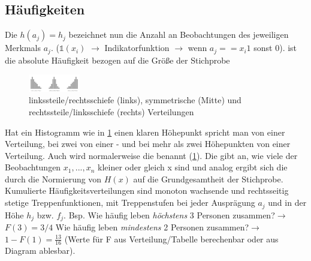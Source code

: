 \subsection{Häufigkeiten}
Die  $h(a_j) = h_j$ bezeichnet nun die Anzahl an Beobachtungen des jeweiligen Merkmals $a_j$.  ($\mathds{1}(x_i)$ $\rightarrow$ Indikatorfunktion $\rightarrow$ wenn $a_j == x_i 1$ sonst $0$).  ist die absolute Häufigkeit bezogen auf die Größe der Stichprobe  
\begin{figure}
    \centering
    \includegraphics[width=0.2\textwidth]{images/2.3_histogramme_schiefheit.png}
    \caption{linkssteile/rechtsschiefe (links), symmetrische (Mitte) und rechtssteile/linksschiefe
    (rechts) Verteilungen}
    \vspace{-12mm}
    \label{fig:schiefheit}
\end{figure}
Hat ein Histogramm wie in \cref{fig:schiefheit} einen klaren Höhepunkt spricht man von einer  Verteilung, bei zwei von einer - und bei mehr als zwei Höhepunkten von einer  Verteilung. Auch wird normalerweise die  benannt (\cref{fig:schiefheit}).
Die  gibt an, wie viele der Beobachtungen $x_1, ..., x_n$ kleiner oder gleich x sind und analog ergibt sich die   durch die Normierung von $H(x)$ auf die Grundgesamtheit der Stichprobe. Kumulierte Häufigkeitsverteilungen sind monoton wachsende und rechtsseitig stetige Treppenfunktionen, mit Treppenstufen bei jeder Ausprägung $a_j$ und in der Höhe $h_j$ bzw. $f_j$. Bsp. \glqq Wie häufig leben \emph{höchstens} 3 Personen zusammen?\grqq $\rightarrow$ $F(3) = 3/4$  \glqq Wie häufig leben \emph{mindestens} 2 Personen zusammen?\grqq $\rightarrow$ $1 - F(1) = \frac{13}{16}$ (Werte für F aus Verteilung/Tabelle berechenbar oder aus Diagram ablesbar).
\\\\ 
